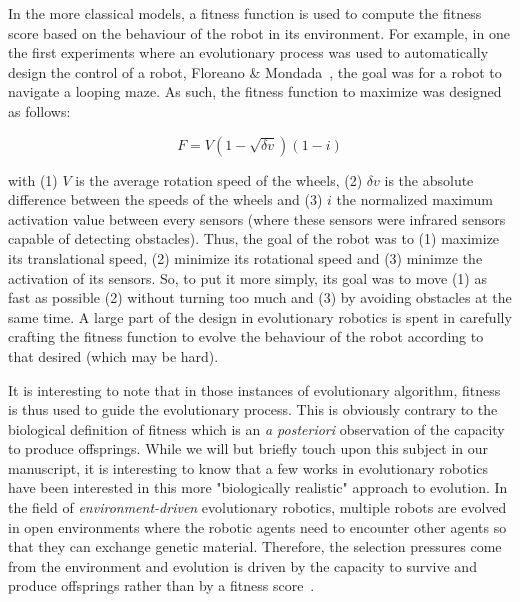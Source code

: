     In the more classical models, a fitness function is used to compute the fitness score based on the behaviour of the robot in its environment. For example, in one the first experiments where an evolutionary process was used to automatically design the control of a robot, Floreano \& Mondada~\parencite{Floreano1994}, the goal was for a robot to navigate a looping maze. As such, the fitness function to maximize was designed as follows:

    \[
      F = V(1-\sqrt{\delta v})(1-i)
    \]

    with (1) $V$ is the average rotation speed of the wheels, (2) $\delta v$ is the absolute difference between the speeds of the wheels and (3) $i$ the normalized maximum activation value between every sensors (where these sensors were infrared sensors capable of detecting obstacles). Thus, the goal of the robot was to (1) maximize its translational speed, (2) minimize its rotational speed and (3) minimze the activation of its sensors. So, to put it more simply, its goal was to move (1) as fast as possible (2) without turning too much and (3) by avoiding obstacles at the same time. A large part of the design in evolutionary robotics is spent in carefully crafting the fitness function to evolve the behaviour of the robot according to that desired (which may be hard).

    It is interesting to note that in those instances of evolutionary algorithm, fitness is thus used to guide the evolutionary process. This is obviously contrary to the biological definition of fitness which is an \emph{a posteriori} observation of the capacity to produce offsprings. While we will but briefly touch upon this subject in our manuscript, it is interesting to know that a few works in evolutionary robotics have been interested in this more "biologically realistic" approach to evolution. In the field of \emph{environment-driven} evolutionary robotics, multiple robots are evolved in open environments where the robotic agents need to encounter other agents so that they can exchange genetic material. Therefore, the selection pressures come from the environment and evolution is driven by the capacity to survive and produce offsprings rather than by a fitness score~\parencite{Ray1991, Bianco2004, Bredeche2010}.

